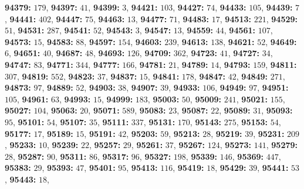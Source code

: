 \textsf{\bfseries 94379:} $179$, \textsf{\bfseries 94397:} $41$, \textsf{\bfseries 94399:} $3$, \textsf{\bfseries 94421:} $103$, \textsf{\bfseries 94427:} $74$, \textsf{\bfseries 94433:} $105$, \textsf{\bfseries 94439:} $7$, \textsf{\bfseries 94441:} $402$, \textsf{\bfseries 94447:} $75$, \textsf{\bfseries 94463:} $13$, \textsf{\bfseries 94477:} $71$, \textsf{\bfseries 94483:} $17$, \textsf{\bfseries 94513:} $221$, \textsf{\bfseries 94529:} $51$, \textsf{\bfseries 94531:} $287$, \textsf{\bfseries 94541:} $52$, \textsf{\bfseries 94543:} $3$, \textsf{\bfseries 94547:} $13$, \textsf{\bfseries 94559:} $44$, \textsf{\bfseries 94561:} $107$, \textsf{\bfseries 94573:} $15$, \textsf{\bfseries 94583:} $88$, \textsf{\bfseries 94597:} $154$, \textsf{\bfseries 94603:} $239$, \textsf{\bfseries 94613:} $138$, \textsf{\bfseries 94621:} $52$, \textsf{\bfseries 94649:} $6$, \textsf{\bfseries 94651:} $40$, \textsf{\bfseries 94687:} $48$, \textsf{\bfseries 94693:} $126$, \textsf{\bfseries 94709:} $362$, \textsf{\bfseries 94723:} $41$, \textsf{\bfseries 94727:} $34$, \textsf{\bfseries 94747:} $83$, \textsf{\bfseries 94771:} $344$, \textsf{\bfseries 94777:} $166$, \textsf{\bfseries 94781:} $21$, \textsf{\bfseries 94789:} $14$, \textsf{\bfseries 94793:} $159$, \textsf{\bfseries 94811:} $307$, \textsf{\bfseries 94819:} $552$, \textsf{\bfseries 94823:} $37$, \textsf{\bfseries 94837:} $15$, \textsf{\bfseries 94841:} $178$, \textsf{\bfseries 94847:} $42$, \textsf{\bfseries 94849:} $271$, \textsf{\bfseries 94873:} $97$, \textsf{\bfseries 94889:} $52$, \textsf{\bfseries 94903:} $38$, \textsf{\bfseries 94907:} $39$, \textsf{\bfseries 94933:} $106$, \textsf{\bfseries 94949:} $97$, \textsf{\bfseries 94951:} $105$, \textsf{\bfseries 94961:} $63$, \textsf{\bfseries 94993:} $15$, \textsf{\bfseries 94999:} $183$, \textsf{\bfseries 95003:} $50$, \textsf{\bfseries 95009:} $241$, \textsf{\bfseries 95021:} $155$, \textsf{\bfseries 95027:} $104$, \textsf{\bfseries 95063:} $20$, \textsf{\bfseries 95071:} $589$, \textsf{\bfseries 95083:} $23$, \textsf{\bfseries 95087:} $22$, \textsf{\bfseries 95089:} $31$, \textsf{\bfseries 95093:} $95$, \textsf{\bfseries 95101:} $54$, \textsf{\bfseries 95107:} $35$, \textsf{\bfseries 95111:} $337$, \textsf{\bfseries 95131:} $170$, \textsf{\bfseries 95143:} $275$, \textsf{\bfseries 95153:} $54$, \textsf{\bfseries 95177:} $17$, \textsf{\bfseries 95189:} $15$, \textsf{\bfseries 95191:} $42$, \textsf{\bfseries 95203:} $59$, \textsf{\bfseries 95213:} $28$, \textsf{\bfseries 95219:} $39$, \textsf{\bfseries 95231:} $209$, \textsf{\bfseries 95233:} $10$, \textsf{\bfseries 95239:} $22$, \textsf{\bfseries 95257:} $29$, \textsf{\bfseries 95261:} $37$, \textsf{\bfseries 95267:} $124$, \textsf{\bfseries 95273:} $141$, \textsf{\bfseries 95279:} $28$, \textsf{\bfseries 95287:} $90$, \textsf{\bfseries 95311:} $86$, \textsf{\bfseries 95317:} $96$, \textsf{\bfseries 95327:} $198$, \textsf{\bfseries 95339:} $146$, \textsf{\bfseries 95369:} $447$, \textsf{\bfseries 95383:} $29$, \textsf{\bfseries 95393:} $47$, \textsf{\bfseries 95401:} $95$, \textsf{\bfseries 95413:} $116$, \textsf{\bfseries 95419:} $18$, \textsf{\bfseries 95429:} $39$, \textsf{\bfseries 95441:} $53$, \textsf{\bfseries 95443:} $18$, 
